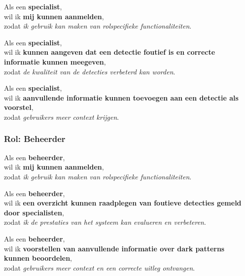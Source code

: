 Als een \textbf{specialist}, \\
wil ik \textbf{mij kunnen aanmelden}, \\
zodat \textit{ik gebruik kan maken van rolspecifieke functionaliteiten}.

\vspace{1em}

Als een \textbf{specialist}, \\
wil ik \textbf{kunnen aangeven dat een detectie foutief is en correcte informatie kunnen meegeven}, \\
zodat \textit{de kwaliteit van de detecties verbeterd kan worden}.

\vspace{1em}

Als een \textbf{specialist}, \\
wil ik \textbf{aanvullende informatie kunnen toevoegen aan een detectie als voorstel}, \\
zodat \textit{gebruikers meer context krijgen}.

\vspace{1.5em}

\subsubsection{Rol: Beheerder}

\vspace{1em}

Als een \textbf{beheerder}, \\
wil ik \textbf{mij kunnen aanmelden}, \\
zodat \textit{ik gebruik kan maken van rolspecifieke functionaliteiten}.

\vspace{1em}

Als een \textbf{beheerder}, \\
wil ik \textbf{een overzicht kunnen raadplegen van foutieve detecties gemeld door specialisten}, \\
zodat \textit{ik de prestaties van het systeem kan evalueren en verbeteren}.

\newpage

Als een \textbf{beheerder}, \\
wil ik \textbf{voorstellen van aanvullende informatie over dark patterns kunnen beoordelen}, \\
zodat \textit{gebruikers meer context en een correcte uitleg ontvangen}.

\vspace{1em}

